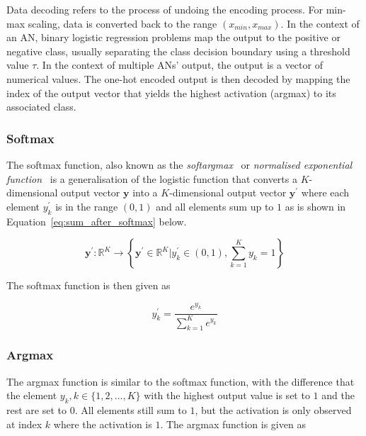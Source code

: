 Data decoding refers to the process of undoing the encoding process. For min-max scaling, data is converted back to the range $(x_{min}, x_{max})$. In the context of an \acs{AN}, binary logistic regression problems map the output to the positive or negative class, usually separating the class decision boundary using a threshold value $\tau$. In the context of multiple \acp{AN}' output, the output is a vector of numerical values. The one-hot encoded output is then decoded by mapping the index of the output vector that yields the highest activation (argmax) to its associated class.

\subsubsection{Softmax}\label{sec:anns:an:output:softmax}

The softmax function, also known as the \textit{softargmax}~\cite[p.~184]{ref:goodfellow:2016} or \textit{normalised exponential function}~\cite{ref:bishop:2006} is a generalisation of the logistic function that converts a $K$-dimensional output vector $\boldsymbol{y}$ into a $K$-dimensional output vector $\boldsymbol{y^{'}}$ where each element $y^{'}_k$ is in the range $(0,1)$ and all elements sum up to $1$ as is shown in Equation~\eqref{eq:sum_after_softmax} below.

\begin{equation}
      \boldsymbol{y^{'}} \colon \mathbb{R}^{K} \to \left\{\boldsymbol{y^{'}} \in \mathbb{R}^{K} \vert y^{'}_k \in (0,1), \sum_{k=1}^{K} y_k = 1\right\}
      \label{eq:sum_after_softmax}
\end{equation}

The softmax function is then given as

\begin{equation}
      y^{'}_k = \frac{e^{y_k}}{\sum_{k = 1}^{K}e^{y_k}}
      \label{eq:softmax}
\end{equation}


\subsubsection{Argmax}\label{sec:anns:an:output:argmax}

The argmax function is similar to the softmax function, with the difference that the element $y_k, k \in \{1,2, \dots, K\}$ with the highest output value is set to $1$ and the rest are set to $0$. All elements still sum to $1$, but the activation is only observed at index $k$ where the activation is $1$. The argmax function is given as

